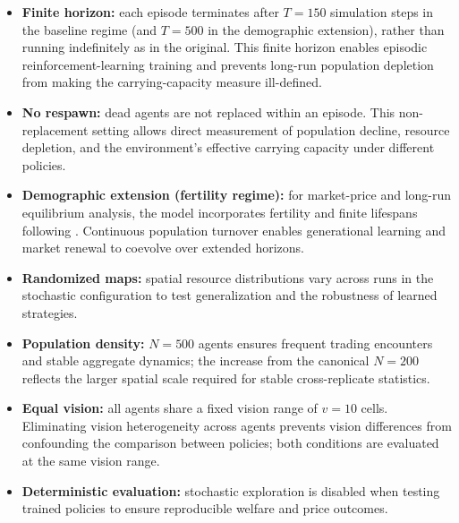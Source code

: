 \documentclass[pdflatex,sn-mathphys-num]{sn-jnl}%
\theoremstyle{thmstyleone}%
\theoremstyle{thmstyletwo}%
\theoremstyle{thmstylethree}%
\begin{document}
\begin{itemize}
    \item \textbf{Finite horizon:} each episode terminates after $T = 150$ simulation steps in the baseline regime (and $T = 500$ in the demographic extension), rather than running indefinitely as in the original. This finite horizon enables episodic reinforcement-learning training and prevents long-run population depletion from making the carrying-capacity measure ill-defined.
    
    \item \textbf{No respawn:} dead agents are not replaced within an episode. This non-replacement setting allows direct measurement of population decline, resource depletion, and the environment's effective carrying capacity under different policies.
    
    \item \textbf{Demographic extension (fertility regime):} for market-price and long-run equilibrium analysis, the model incorporates fertility and finite lifespans following \citet{EpsteinAxtell1996}. Continuous population turnover enables generational learning and market renewal to coevolve over extended horizons.
    
    \item \textbf{Randomized maps:} spatial resource distributions vary across runs in the stochastic configuration to test generalization and the robustness of learned strategies.
    
    \item \textbf{Population density:} $N = 500$ agents ensures frequent trading encounters and stable aggregate dynamics; the increase from the canonical $N = 200$ reflects the larger spatial scale required for stable cross-replicate statistics.
    
    \item \textbf{Equal vision:} all agents share a fixed vision range of $v = 10$ cells. Eliminating vision heterogeneity across agents prevents vision differences from confounding the comparison between policies; both conditions are evaluated at the same vision range.
    
    \item \textbf{Deterministic evaluation:} stochastic exploration is disabled when testing trained policies to ensure reproducible welfare and price outcomes.
\end{itemize}
\end{document}
